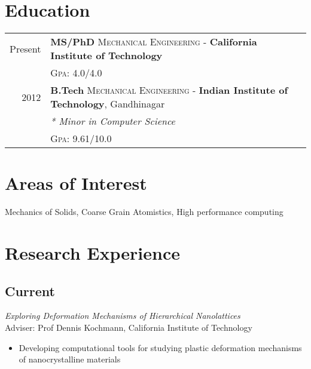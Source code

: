 \documentclass[10pt,fleqn]{article}
\begin{document}
\section*{Education}

\begin{tabular}{rl}	
Present & \textbf{MS/PhD} \textsc{Mechanical Engineering} -  \textbf{California Institute of Technology}\\
&\normalsize \textsc{Gpa}: 4.0/4.0\\


2012 & \textbf{B.Tech} \textsc{Mechanical Engineering} -  
\normalsize\textbf{Indian Institute of Technology},  Gandhinagar\\
& \small\emph{* Minor in Computer Science}\\
&\normalsize \textsc{Gpa}: 9.61/10.0\\
\end{tabular}

\section*{Areas of Interest}
Mechanics of Solids, Coarse Grain Atomistics, High performance computing
\section*{Research Experience}
\subsection*{Current}
\emph{Exploring Deformation Mechanisms of Hierarchical Nanolattices}\\
 Adviser: Prof Dennis Kochmann, California Institute of Technology
 \begin{itemize}
 \item  Developing computational tools for studying plastic deformation mechanisms of nanocrystalline materials
 \end{itemize}

\end{document}
